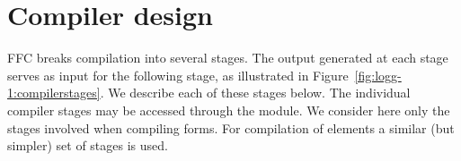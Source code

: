 \section{Compiler design}

FFC breaks compilation into several stages. The output
generated at each stage serves as input for the following stage, as
illustrated in Figure~\ref{fig:logg-1:compilerstages}. We describe each of
these stages below. The individual compiler stages may be accessed
through the  module. We consider here only the
stages involved when compiling forms. For compilation of elements a
similar (but simpler) set of stages is used.

\begin{figure}
  \begin{center}

\end{center}
\end{figure}
